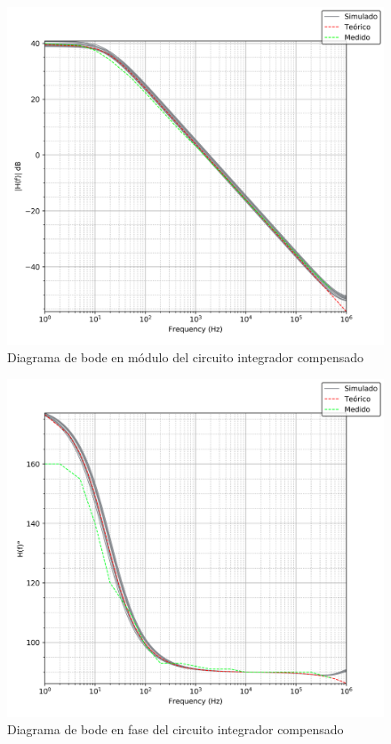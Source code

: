 \begin{figure}[H]
	\centering
	\includegraphics[scale=0.6]{../EJ4/Recursos/Integrador_compensado/bode_modulo.png}
	\caption{Diagrama de bode en m\'odulo del circuito integrador compensado}
	\label{fig:integrador_compensado_bode_modulo}
\end{figure}

\begin{figure}[H]
	\centering
	\includegraphics[scale=0.6]{../EJ4/Recursos/Integrador_compensado/bode_fase.png}
	\caption{Diagrama de bode en fase del circuito integrador compensado}
	\label{fig:integrador_compensado_bode_fase}
\end{figure}

